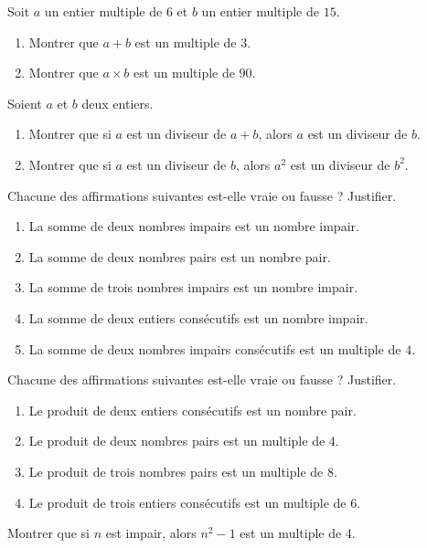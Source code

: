 \exo

Soit $a$ un entier multiple de $6$ et $b$ un entier multiple de $15$.
\begin{enumerate}
\item Montrer que $a+b$ est un multiple de $3$.
\item Montrer que $a\times b$ est un multiple de $90$.
\end{enumerate}

\exo

Soient $a$ et $b$ deux entiers.
\begin{enumerate}
\item Montrer que si $a$ est un diviseur de $a+b$, alors $a$ est un diviseur de $b$.
\item Montrer que si $a$ est un diviseur de $b$, alors $a^2$ est un diviseur de $b^2$.
\end{enumerate}

\exo

Chacune des affirmations suivantes est-elle vraie ou fausse ? Justifier.
\begin{enumerate}
\item La somme de deux nombres impairs est un nombre impair.
\item La somme de deux nombres pairs est un nombre pair.
\item La somme de trois nombres impairs est un nombre impair.
\item La somme de deux entiers consécutifs est un nombre impair.
\item La somme de deux nombres impairs consécutifs est un multiple de $4$.
\end{enumerate}

\exo

Chacune des affirmations suivantes est-elle vraie ou fausse ? Justifier.
\begin{enumerate}
\item Le produit de deux entiers consécutifs est un nombre pair.
\item Le produit de deux nombres pairs est un multiple de $4$.
\item Le produit de trois nombres pairs est un multiple de $8$.
\item Le produit de trois entiers consécutifs est un multiple de $6$.
\end{enumerate}

\exo

Montrer que si $n$ est impair, alors $n^2-1$ est un multiple de $4$.

\exo

